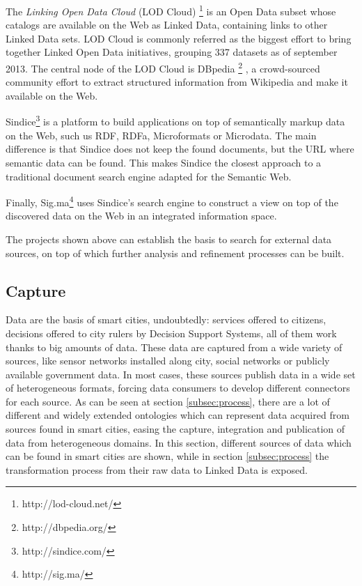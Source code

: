 The \textit{Linking Open Data Cloud} (LOD Cloud) \footnote{http://lod-cloud.net/} is an Open Data subset whose catalogs are available on the Web as Linked Data, containing links to other Linked Data sets. LOD Cloud is commonly referred as the biggest effort to bring together Linked Open Data initiatives, grouping 337 datasets as of september 2013. The central node of the LOD Cloud is DBpedia \footnote{http://dbpedia.org/} \cite{auer2007dbpedia, bizer2009dbpedia}, a crowd-sourced community effort to extract structured information from Wikipedia and make it available on the Web.

Sindice\footnote{http://sindice.com/} \cite{tummarello2007sindice} is a platform to build applications on top of semantically markup data on the Web, such us RDF, RDFa, Microformats or Microdata. The main difference is that Sindice does not keep the found documents, but the URL where semantic data can be found. This makes Sindice the closest approach to a traditional document search engine adapted for the Semantic Web.

Finally, Sig.ma\footnote{http://sig.ma/} \cite{tummarello2010sig} uses Sindice's search engine to construct a view on top of the discovered data on the Web in an integrated information space.

The projects shown above can establish the basis to search for external data sources, on top of which further analysis and refinement processes can be built.

\subsection{Capture}
\label{sec:capture}

Data are the basis of smart cities, undoubtedly: services offered to citizens, decisions offered to city rulers by Decision Support Systems, all of them work thanks to big amounts of data. These data are captured from a wide variety of sources, like sensor networks installed along city, social networks or publicly available government data. In most cases, these sources publish data in a wide set of heterogeneous formats, forcing data consumers to develop different connectors for each source. As can be seen at section \ref{subsec:process}, there are a lot of different and widely extended ontologies which can represent data acquired from sources found in smart cities, easing the capture, integration and publication of data from heterogeneous domains. In this section, different sources of data which can be found in smart cities are shown, while in section \ref{subsec:process} the transformation process from their raw data to Linked Data is exposed.

